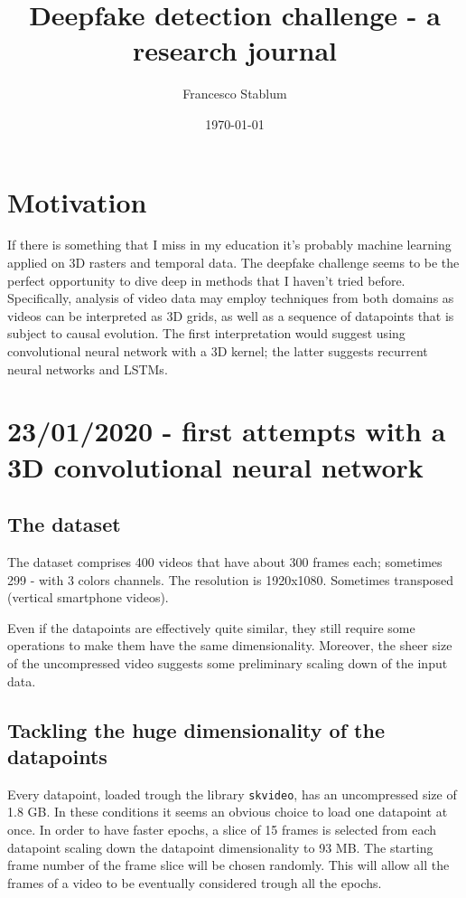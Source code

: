 \documentclass{article}
\title{Deepfake detection challenge - a research journal}
\author{Francesco Stablum}
\date{\today}
\begin{document}
\maketitle

\section{Motivation}

If there is something that I miss in my education it's probably
machine learning applied on 3D rasters and temporal data.
The deepfake challenge seems to be the perfect opportunity
to dive deep in methods that I haven't tried before.
Specifically, analysis of video data may employ techniques from both domains
as videos can be interpreted as 3D grids, as well as a sequence of datapoints that
is subject to causal evolution. The first interpretation would suggest using
convolutional neural network with a 3D kernel; the latter suggests recurrent neural networks
and LSTMs.

\section{23/01/2020 - first attempts with a 3D convolutional neural network}

\subsection{The dataset}
The dataset comprises 400 videos that have about 300 frames each; sometimes
299 - with 3 colors channels.
The resolution is 1920x1080. Sometimes transposed (vertical smartphone videos).

Even if the datapoints are effectively quite similar, they still require some operations
to make them have the same dimensionality. Moreover, the sheer size of the uncompressed
video suggests some preliminary scaling down of the input data.

\subsection{Tackling the huge dimensionality of the datapoints}

Every datapoint, loaded trough the library \texttt{skvideo}, has an uncompressed
size of 1.8 GB. In these conditions it seems an obvious choice to load one datapoint at once.
In order to have faster epochs, a slice of 15 frames is selected from each datapoint
scaling down the datapoint dimensionality to 93 MB.
The starting frame number of the frame slice will be chosen randomly. This will allow
all the frames of a video to be eventually considered trough all the epochs.
\end{document}
